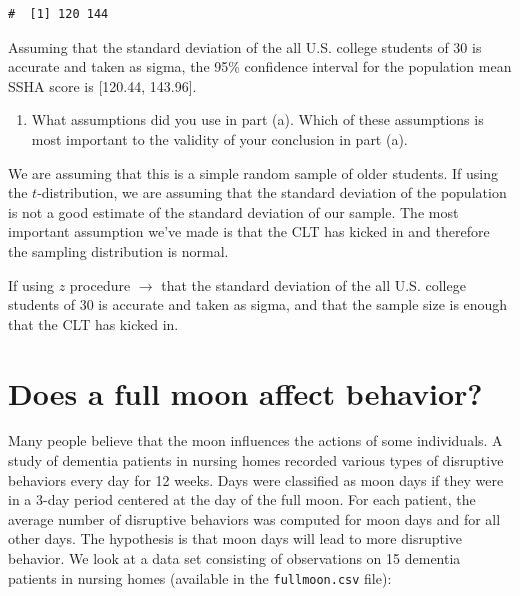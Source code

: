 \documentclass[letterpaper,11pt,twoside,]{pinp}
\providecommand{\tightlist}{%
  \setlength{\itemsep}{0pt}\setlength{\parskip}{0pt}}
\begin{document}
\begin{ShadedResult}
\begin{verbatim}
#  [1] 120 144
\end{verbatim}
\end{ShadedResult}

Assuming that the standard deviation of the all U.S. college students of
30 is accurate and taken as sigma, the 95\% confidence interval for the
population mean SSHA score is {[}120.44, 143.96{]}.

\begin{enumerate}
\def\labelenumi{\alph{enumi}.}
\setcounter{enumi}{1}
\tightlist
\item
  What assumptions did you use in part (a). Which of these assumptions
  is most important to the validity of your conclusion in part (a).
\end{enumerate}

We are assuming that this is a simple random sample of older students.
If using the \(t\)-distribution, we are assuming that the standard
deviation of the population is not a good estimate of the standard
deviation of our sample. The most important assumption we've made is
that the CLT has kicked in and therefore the sampling distribution is
normal.

If using \(z\) procedure \(\to\) that the standard deviation of the all
U.S. college students of 30 is accurate and taken as sigma, and that the
sample size is enough that the CLT has kicked in.

\hypertarget{does-a-full-moon-affect-behavior}{%
\section{Does a full moon affect
behavior?}\label{does-a-full-moon-affect-behavior}}

Many people believe that the moon influences the actions of some
individuals. A study of dementia patients in nursing homes recorded
various types of disruptive behaviors every day for 12 weeks. Days were
classified as moon days if they were in a 3-day period centered at the
day of the full moon. For each patient, the average number of disruptive
behaviors was computed for moon days and for all other days. The
hypothesis is that moon days will lead to more disruptive behavior. We
look at a data set consisting of observations on 15 dementia patients in
nursing homes (available in the \texttt{fullmoon.csv} file):

\begin{Shaded}
\begin{Highlighting}[]
\OtherTok{\textless{}{-}} \NormalTok{(}\NormalTok{)}
\end{Highlighting}
\end{Shaded}
\end{document}
